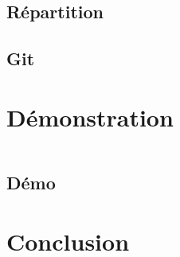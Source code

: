 \documentclass{beamer}
\begin{document}
        \subsection{Répartition} 
	        
	    \subsection{Git} %
	            
	
	  \section{Démonstration}
        \begin{frame}
            \begin{columns}[t]
  				\begin{column}{5cm}
  					\tableofcontents[sections={1-4}, currentsection, hideothersubsections]
  				\end{column}
  				\begin{column}{5cm}
  				\tableofcontents[sections={5-9}, currentsection, hideothersubsections]
  				\end{column}
  			\end{columns}
        \end{frame}
        \subsection{Démo}
	        
        	
    \section{Conclusion}
        \subsection{}
            
\end{document}
